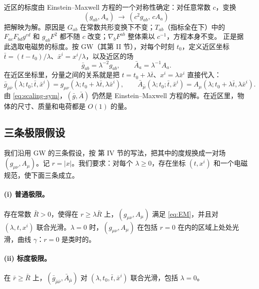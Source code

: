 \documentclass[11pt,a4paper]{ctexart}
\begin{document}
近区的标度由 Einstein--Maxwell 方程的一个对称性确定：对任意常数 $c$，变换
\begin{equation}
(g_{ab},A_a)\ \to\ (c^2g_{ab},\,cA_a)
\label{eq:scaling-sym}
\end{equation}
把解映为解。原因是 $G_{ab}$ 在常数共形变换下不变；$T_{ab}$（指标全在下）中的 $F_{ac}F_{bd}g^{cd}$ 和 $g_{ab}F^2$ 都不随 $c$ 改变；$\nabla_bF^{ab}$ 整体乘以 $c^{-1}$，方程本身不变。\citet{Gralla2010} 正是据此选取电磁势的标度。按 GW（其第 II 节），对每个时刻 $t_0$，定义近区坐标 $\bar t=(t-t_0)/\lambda$、$\bar x^i=x^i/\lambda$，以及近区的场
\begin{equation}
\bar g_{ab}=\lambda^{-2}g_{ab},\qquad \bar A_a=\lambda^{-1}A_a.
\label{eq:scaled}
\end{equation}
在近区坐标里，分量之间的关系就是把 $t=t_0+\lambda\bar t$、$x^i=\lambda\bar x^i$ 直接代入：
\begin{equation}
\bar g_{\bar\mu\bar\nu}(\lambda;t_0;\bar t,\bar x^i)=g_{\mu\nu}(\lambda;t_0+\lambda\bar t,\lambda\bar x^i),\qquad
\bar A_{\bar\mu}(\lambda;t_0;\bar t,\bar x^i)=A_\mu(\lambda;t_0+\lambda\bar t,\lambda\bar x^i).
\label{eq:scaled-comp}
\end{equation}
由 \eqref{eq:scaling-sym}，$(\bar g,\bar A)$ 仍然是 Einstein--Maxwell 方程的解。在近区里，物体的尺寸、质量和电荷都是 $O(1)$ 的量。

\subsection{三条极限假设}\label{sec:conditions}

我们沿用 GW 的三条假设，按 \citet{Gralla2010} 第 IV 节的写法，把其中的度规换成一对场 $(g_{\mu\nu},A_\mu)$。记 $r=|x|$。我们要求：对每个 $\lambda\ge0$，存在坐标 $(t,x^i)$ 和一个电磁规范，使下面三条成立。

\paragraph{(i) 普通极限。}存在常数 $\bar R>0$，使得在 $r\ge\lambda\bar R$ 上，$(g_{\mu\nu},A_\mu)$ 满足 \eqref{eq:EM}，并且对 $(\lambda,t,x^i)$ 联合光滑。$\lambda=0$ 时，$(g_{\mu\nu},A_\mu)$ 在包括 $r=0$ 在内的区域上处处光滑，曲线 $\gamma$：$r=0$ 是类时的。

\paragraph{(ii) 标度极限。}在 $\bar r\ge\bar R$ 上，$(\bar g_{\bar\mu\bar\nu},\bar A_{\bar\mu})$ 对 $(\lambda,t_0,\bar t,\bar x^i)$ 联合光滑，包括 $\lambda=0$。
\end{document}
